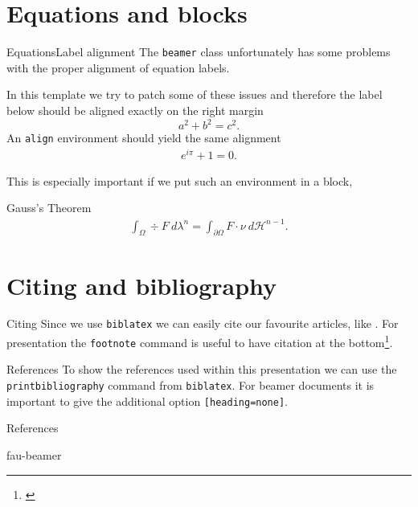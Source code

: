 \section{Equations and blocks}
%
%
%
%
%
\begin{frame}{Equations}{Label alignment}
	The \texttt{beamer} class unfortunately has some problems with the proper
	alignment of equation labels.

	\pause
	In this template we try to patch some of these issues and therefore the label
	below should be aligned exactly on the right margin
	\begin{equation}\label{eq:pythagoras}
		a^2 + b^2 = c^2.
	\end{equation}
	An \texttt{align} environment should yield the same alignment
	\begin{align}\label{eq:euler}
		e^{i\pi} +1= 0.
	\end{align}

	This is especially important if we put such an environment in a block,

	\begin{block}{Gauss's Theorem}
		\begin{align}\label{eq:gauss}
			\int_\Omega \div F\ d\lambda^n = \int_{\partial\Omega} F\cdot \nu\ d\mathcal{H}^{n-1}.
		\end{align}
	\end{block}
\end{frame}
\section{Citing and bibliography}
%
%
%
%
%
\begin{frame}{Citing}
	Since we use \texttt{biblatex} we can easily cite our favourite articles, like
	\cite{Floratou2019, Furche2016}. For presentation the \texttt{footnote} command is useful to have citation at the bottom\footnote{\cite{jvalue:jayvee}}.
\end{frame}
%
%
%
%
%
\begin{frame}{References}
	To show the references used within this presentation we can use the \texttt{printbibliography} command from \texttt{biblatex}. For beamer documents it is important to give the additional option \texttt{[heading=none]}.
	\begin{block}{References}
		\printbibliography[heading=none]
	\end{block}
\end{frame}
%
%
%
%
%
\begin{frame}{fau-beamer}
\end{frame}
